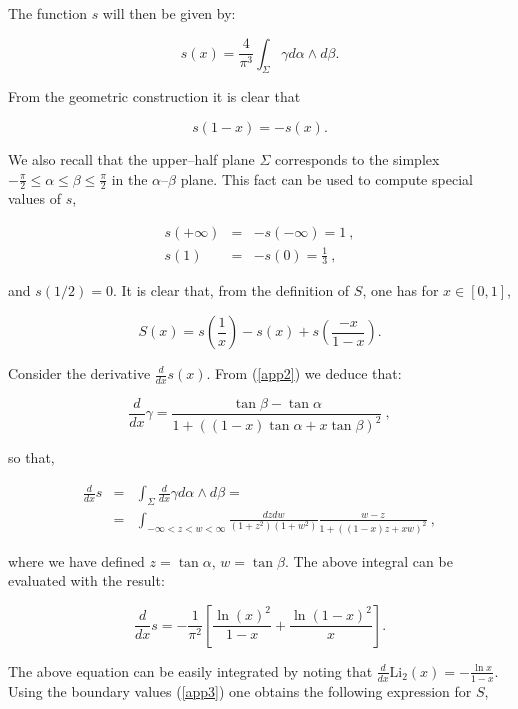 \documentclass[a4paper,11pt]{article}
\begin{document}
\noindent
The function $s$ will then be given by:

$$
s\left( x\right) = \frac{4}{\pi ^{3}}\int_{\Sigma }\gamma d\alpha \wedge
d\beta .
$$

\noindent
From the geometric construction it is clear that 

$$
s\left( 1-x\right) = - s\left( x\right) .
$$

\noindent
We also recall that the upper--half plane $\Sigma $ corresponds to the
simplex $-\frac{\pi }{2}\leq \alpha \leq \beta \leq \frac{\pi }{2}$ in the 
$\alpha $--$\beta $ plane. This fact can be used to compute special values of 
$s$,

\begin{eqnarray}
s\left( +\infty \right) &=& - s\left( -\infty \right) =1\ , \nonumber \\
s\left( 1\right) &=& - s\left( 0\right) =\frac{1}{3}\ , \label{app3}
\end{eqnarray}

\noindent
and $s\left( 1/2 \right) = 0$. It is clear that, from the definition of 
$S$, one has for $x\in \left[ 0,1\right] $, 

\begin{equation}
S\left( x\right) =s\left( \frac{1}{x}\right) -s\left( x\right) +s\left( 
\frac{-x}{1-x}\right) .  \label{app4}
\end{equation}

\noindent
Consider the derivative $\frac{d}{dx}s\left( x\right) $. From (\ref{app2})
we deduce that:

$$
\frac{d}{dx}\gamma =\frac{\tan \beta -\tan \alpha }{1+\left( \left(
1-x\right) \tan \alpha +x\tan \beta \right) ^{2}}\ ,
$$

\noindent
so that,

\begin{eqnarray*}
\frac{d}{dx}s &=&\int_{\Sigma }\frac{d}{dx}\gamma d\alpha \wedge d\beta = \\
&=&\int_{-\infty <z<w<\infty }\frac{dzdw}{\left( 1+z^{2}\right) \left(
1+w^{2}\right) }\frac{w-z}{1+\left( \left( 1-x\right) z+xw\right) 
^{2}}\ ,
\end{eqnarray*}

\noindent
where we have defined $z=\tan \alpha $, $w=\tan \beta $. The above integral
can be evaluated with the result:

$$
\frac{d}{dx}s=-\frac{1}{\pi ^{2}}\left[ \frac{\ln \left( x\right) 
^{2}}{1-x} + \frac{\ln \left( 1-x\right) ^{2}}{x}\right] .
$$

\noindent
The above equation can be easily integrated by noting that 
$\frac{d}{dx} \mathrm{Li}_2\left( x\right) =-\frac{\ln x}{1-x}$. Using the 
boundary values (\ref{app3}) one obtains the following expression for 
$S$,
\end{document}
